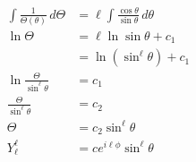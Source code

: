 \documentclass{article}
\begin{document}
\begin{enumerate}
\begin{align*}
          \int \frac{1}{\Theta(\theta)} \,d \Theta                         & = \ell \int \frac{\cos \theta}{\sin \theta} \,d \theta                                                                                           \\
          \ln \Theta                                                       & = \ell \ln \sin \theta + c_1                                                                                                                     \\
                                                                           & = \ln (\sin^\ell \theta) + c_1                                                                                                                   \\
          \ln \frac{\Theta}{\sin^\ell \theta}                              & = c_1                                                                                                                                            \\
          \frac{\Theta}{\sin^\ell \theta}                                  & = c_2                                                                                                                                            \\
          \Theta                                                           & = c_2 \sin^\ell \theta                                                                                                                           \\
          Y_\ell^\ell                                                      & = c e^{i \ell \phi} \sin^\ell \theta
        \end{align*}
\end{enumerate}

\subsection{}
\end{document}
